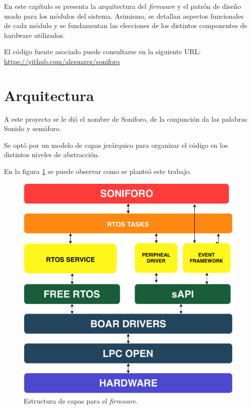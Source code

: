 En este capítulo se presenta la arquitectura del \textit{firmware} y el patrón de diseño usado para los módulos del sistema. Asimismo, se detallan aspectos funcionales de cada módulo y se fundamentan las elecciones de los distintos componentes de hardware utilizados.

El código fuente asociado puede consultarse en la siguiente URL:
\url{https://github.com/alesuarez/soniforo}

\section{Arquitectura}
A este proyecto se le dió el nombre de Soniforo, de la conjunción da las palabras Sonido y semáforo.

Se optó por un modelo de capas jerárquico para organizar el código en los distintos niveles de abstracción.

En la figura \ref{fig:arquitecturaFirmwareGeneralSistema} se puede observar como se planteó este trabajo. 
 \begin{figure}[h]
	\centering
	\includegraphics[scale=.6]{./Figures/arquitecturaGeneralSistema.pdf}
	\caption{Estructura de capas para el \textit{firmware}.}
	\label{fig:arquitecturaFirmwareGeneralSistema}
\end{figure}

